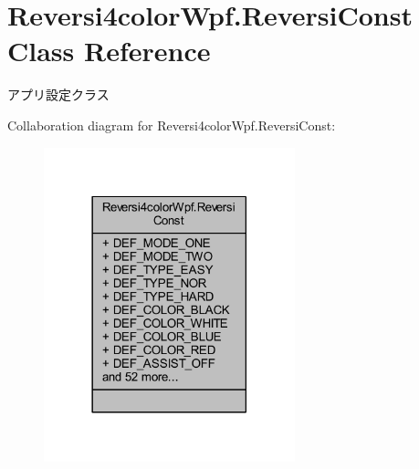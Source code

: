 \hypertarget{class_reversi4color_wpf_1_1_reversi_const}{}\section{Reversi4color\+Wpf.\+Reversi\+Const Class Reference}
\label{class_reversi4color_wpf_1_1_reversi_const}


アプリ設定クラス  




Collaboration diagram for Reversi4color\+Wpf.\+Reversi\+Const\+:\nopagebreak
\begin{figure}[H]
\begin{center}
\leavevmode
\includegraphics[width=206pt]{class_reversi4color_wpf_1_1_reversi_const__coll__graph}
\end{center}
\end{figure}
